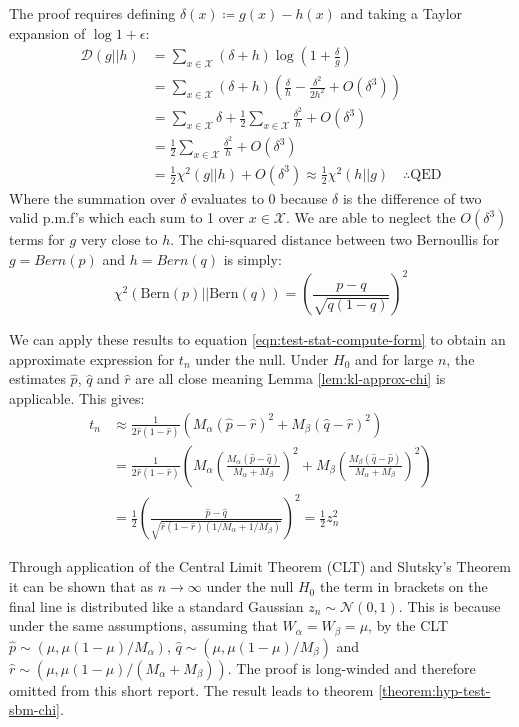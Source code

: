 \documentclass[11pt]{article}
\newcommand{\Xcal}{\mathcal{X}}
\newcommand{\Gaussian}{\mathcal{N}}
\newcommand{\kl}{\mathcal{D}}
\begin{document}
\begin{multicols*}{2}
The proof requires defining $\delta(x) \coloneqq g(x) - h(x)$ and taking a Taylor expansion of $\log 1 + \epsilon$:
%
\begin{align*}
	\kl(g||h) &= \sum_{x \in \Xcal} (\delta + h) \log \left(1 + \frac{\delta}{g} \right) \\
	&= \sum_{x \in \Xcal} (\delta + h) \left( \frac{\delta}{h} - \frac{\delta^2}{2h^2} + O(\delta^3) \right)  \\
	&= \sum_{x \in \Xcal} \delta + \frac{1}{2} \sum_{x \in \Xcal} \frac{\delta^2}{h} + O(\delta^3) \\
	&= \frac{1}{2} \sum_{x \in \Xcal} \frac{\delta^2}{h} + O(\delta^3) \\
	&= \frac{1}{2} \chi^2(g||h) + O(\delta^3) \approx \frac{1}{2} \chi^2(h||g) \quad \therefore \textrm{QED}
\end{align*}
%
Where the summation over $\delta$ evaluates to 0 because $\delta$ is the difference of two valid p.m.f's which each sum to 1 over $x \in \Xcal$. We are able to neglect the $O(\delta^3)$ terms for $g$ very close to $h$. The chi-squared distance between two Bernoullis for $g = Bern(p)$ and $h = Bern(q)$ is simply:
%
\begin{equation}
\chi^2(\textrm{Bern}(p) || \textrm{Bern}(q)) = \left( \frac{p-q}{\sqrt{q(1-q)}} \right)^2
\end{equation}

We can apply these results to equation \ref{eqn:test-stat-compute-form} to obtain an approximate expression for $t_n$ under the null. Under $H_0$ and for large $n$, the estimates $\hat{p}$, $\hat{q}$ and $\hat{r}$ are all close meaning Lemma \ref{lem:kl-approx-chi} is applicable. This gives:
%
\begin{align}
	t_n &\approx \frac{1}{2 \hat{r}(1 - \hat{r})} \left( 
	M_\alpha \left(\hat{p} - \hat{r}\right)^2 +
	M_\beta \left(\hat{q} - \hat{r} \right)^2 
	\right) \nonumber \\
	&= \frac{1}{2 \hat{r}(1-\hat{r})} \left( 
	M_\alpha \left(\frac{M_\alpha (\hat{p} - \hat{q})}{M_\alpha + M_\beta} \right)^2 +
	M_\beta \left(\frac{M_\beta (\hat{q} - \hat{p})}{M_\alpha + M_\beta} \right)^2
	\right) \nonumber \\
	&= \frac{1}{2} \left( \frac{\hat{p} - \hat{q}}{\sqrt{\hat{r}(1- \hat{r})(1/M_\alpha + 1/M_\beta)}} \right)^2
	= \frac{1}{2} z_n^2
\end{align}

Through application of the Central Limit Theorem (CLT) and Slutsky's Theorem it can be shown that as $n \rightarrow \infty$ under the null $H_0$ the term in brackets on the final line is distributed like a standard Gaussian $z_n \sim \Gaussian(0,1)$. This is because under the same assumptions, assuming that $W_\alpha = W_\beta = \mu$, by the CLT $\hat{p} \sim (\mu, \mu(1 - \mu)/ M_\alpha)$, $\hat{q} \sim (\mu, \mu(1 - \mu)/ M_\beta)$ and $\hat{r} \sim (\mu, \mu(1 - \mu)/ (M_\alpha + M_\beta))$. The proof is long-winded and therefore omitted from this short report. The result leads to theorem \ref{theorem:hyp-test-sbm-chi}.


\end{multicols*}
\end{document}
